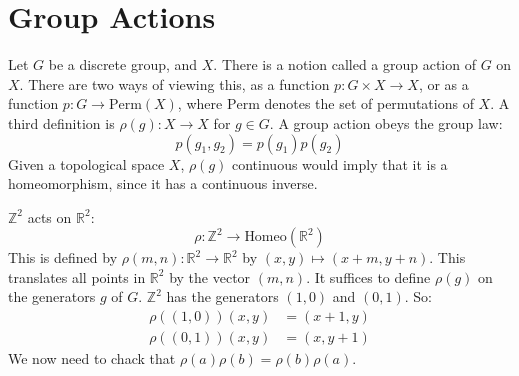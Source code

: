 \section{Group Actions}
    Let $G$ be a discrete group, and $X$. There is a notion
    called a group action of $G$ on $X$. There are two ways
    of viewing this, as a function
    $p:G\times{X}\rightarrow{X}$, or as a function
    $p:G\rightarrow\textrm{Perm}(X)$, where $\textrm{Perm}$
    denotes the set of permutations of $X$. A third definition
    is $\rho(g):X\rightarrow{X}$ for $g\in{G}$.
    A group action obeys the group law:
    \begin{equation}
        p(g_{1},g_{2})=p(g_{1})p(g_{2})
    \end{equation}
    Given a topological space $X$, $\rho(g)$ continuous
    would imply that it is a homeomorphism, since it has
    a continuous inverse.
    \begin{example}
        $\mathbb{Z}^{2}$ acts on $\mathbb{R}^{2}$:
        \begin{equation}
            \rho:\mathbb{Z}^{2}\rightarrow
            \textrm{Homeo}(\mathbb{R}^{2})
        \end{equation}
        This is defined by
        $\rho(m,n):\mathbb{R}^{2}\rightarrow\mathbb{R}^{2}$
        by $(x,y)\mapsto(x+m,y+n)$. This translates all points
        in $\mathbb{R}^{2}$ by the vector $(m,n)$. It suffices
        to define $\rho(g)$ on the generators $g$ of $G$.
        $\mathbb{Z}^{2}$ has the generators $(1,0)$ and $(0,1)$.
        So:
        \begin{subequations}
            \begin{align}
                \rho((1,0))(x,y)&=(x+1,y)\\
                \rho((0,1))(x,y)&=(x,y+1)
            \end{align}
        \end{subequations}
        We now need to chack that
        $\rho(a)\rho(b)=\rho(b)\rho(a)$.
    \end{example}
